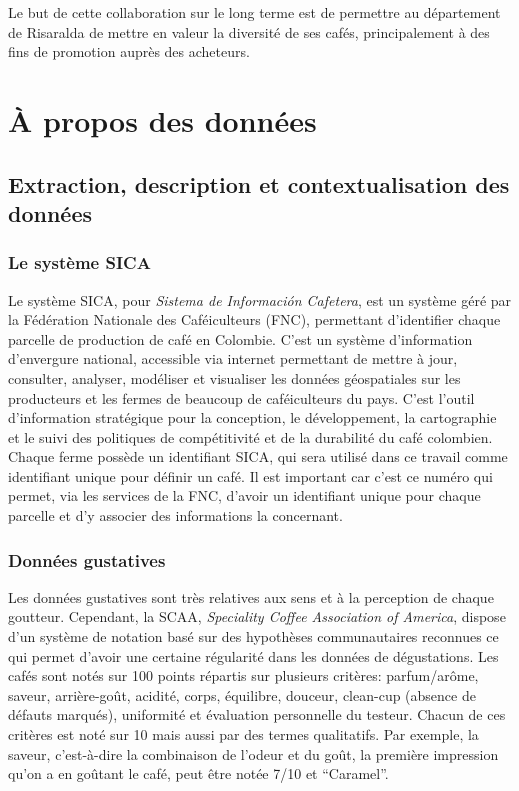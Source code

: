 \noindent Le but de cette collaboration sur le long terme est de permettre au département de Risaralda de mettre en valeur la diversité de ses cafés, principalement à des fins de promotion auprès des acheteurs. \\


\chapter{À propos des données}

\section{Extraction, description et contextualisation des données}

\subsection{Le système SICA}Le système SICA, pour \textit{Sistema de Información Cafetera}, est un système géré par la Fédération Nationale des Caféiculteurs (FNC), permettant d'identifier chaque parcelle de production de café en Colombie. C'est un système d'information d'envergure national, accessible via internet permettant de mettre à jour, consulter, analyser, modéliser et visualiser les données géospatiales sur les producteurs et les fermes de beaucoup de caféiculteurs du pays. C'est l'outil d'information stratégique pour la conception, le développement, la cartographie et le suivi des politiques de compétitivité et de la durabilité du café colombien\cite{SICA}. Chaque ferme possède un identifiant SICA, qui sera utilisé dans ce travail comme identifiant unique pour définir un café. Il est important car c'est ce numéro qui permet, via les services de la FNC, d'avoir un identifiant unique pour chaque parcelle et d'y associer des informations la concernant.  

\subsection{Données gustatives}
Les données gustatives sont très relatives aux sens et à la perception de chaque goutteur. Cependant, la SCAA, \textit{Speciality Coffee Association of America}, dispose d’un système de notation basé sur des hypothèses communautaires reconnues ce qui permet d’avoir une certaine régularité dans les données de dégustations. Les cafés sont notés sur 100 points répartis sur plusieurs critères: parfum/arôme, saveur, arrière-goût, acidité, corps, équilibre, douceur, clean-cup (absence de défauts marqués), uniformité et évaluation personnelle du testeur.  Chacun de ces critères est noté sur 10 mais aussi par des termes qualitatifs. Par exemple, la saveur, c’est-à-dire la combinaison de l’odeur et du goût, la première impression qu’on a en goûtant le café, peut être notée 7/10 et “Caramel”. \\

